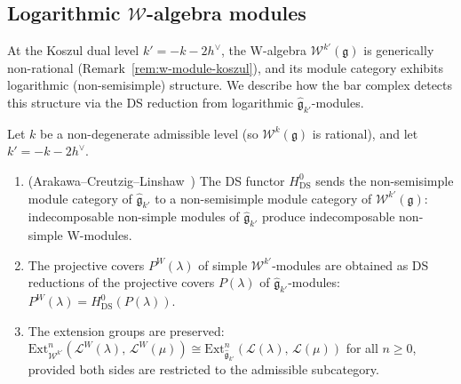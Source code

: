 \subsection{Logarithmic $\mathcal{W}$-algebra modules}
\label{sec:logarithmic-w-modules}

At the Koszul dual level $k' = -k - 2h^\vee$, the W-algebra
$\mathcal{W}^{k'}(\mathfrak{g})$ is generically non-rational
(Remark~\ref{rem:w-module-koszul}), and its module category
exhibits logarithmic (non-semisimple) structure.  We describe
how the bar complex detects this structure via the DS reduction
from logarithmic $\widehat{\mathfrak{g}}_{k'}$-modules.

\begin{proposition}
\label{prop:log-w-modules}
Let $k$ be a non-degenerate admissible level
\textup{(}so $\mathcal{W}^k(\mathfrak{g})$ is
rational\textup{)}, and let $k' = -k - 2h^\vee$.
\begin{enumerate}[label=\textup{(\roman*)}]
\item \textup{(}Arakawa--Creutzig--Linshaw~\cite{ACL19}\textup{)}
  The DS functor $H^0_{\mathrm{DS}}$ sends the non-semisimple
  module category of $\widehat{\mathfrak{g}}_{k'}$ to a
  non-semisimple module category of
  $\mathcal{W}^{k'}(\mathfrak{g})$: indecomposable
  non-simple modules of $\widehat{\mathfrak{g}}_{k'}$
  produce indecomposable non-simple W-modules.
\item The projective covers $P^W(\lambda)$ of simple
  $\mathcal{W}^{k'}$-modules are obtained as DS reductions
  of the projective covers $P(\lambda)$ of
  $\widehat{\mathfrak{g}}_{k'}$-modules\textup{:}
  $P^W(\lambda) = H^0_{\mathrm{DS}}(P(\lambda))$.
\item The extension groups are preserved\textup{:}
  $\mathrm{Ext}^n_{\mathcal{W}^{k'}}
  (\mathcal{L}^W(\lambda),\, \mathcal{L}^W(\mu))
  \cong \mathrm{Ext}^n_{\widehat{\mathfrak{g}}_{k'}}
  (\mathcal{L}(\lambda),\, \mathcal{L}(\mu))$
  for all $n \geq 0$, provided both sides are restricted
  to the admissible subcategory.
\end{enumerate}
\end{proposition}

